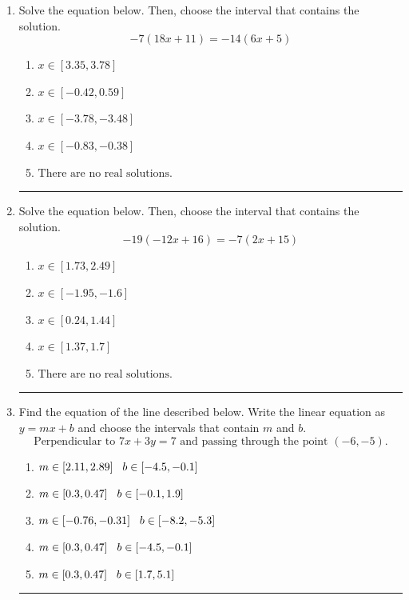 \documentclass[14pt]{extbook}
\newcommand{\litem}[1]{\item#1\hspace*{-1cm}\rule{\textwidth}{0.4pt}}
\begin{document}
\begin{enumerate}
{\begin{enumerate}[label=\Alph*.]
\end{enumerate} }
\litem{
Solve the equation below. Then, choose the interval that contains the solution.\[ -7(18x + 11) = -14(6x + 5) \]\begin{enumerate}[label=\Alph*.]
\item \( x \in [3.35, 3.78] \)
\item \( x \in [-0.42, 0.59] \)
\item \( x \in [-3.78, -3.48] \)
\item \( x \in [-0.83, -0.38] \)
\item \( \text{There are no real solutions.} \)

\end{enumerate} }
\litem{
Solve the equation below. Then, choose the interval that contains the solution.\[ -19(-12x + 16) = -7(2x + 15) \]\begin{enumerate}[label=\Alph*.]
\item \( x \in [1.73, 2.49] \)
\item \( x \in [-1.95, -1.6] \)
\item \( x \in [0.24, 1.44] \)
\item \( x \in [1.37, 1.7] \)
\item \( \text{There are no real solutions.} \)

\end{enumerate} }
\litem{
Find the equation of the line described below. Write the linear equation as $ y=mx+b $ and choose the intervals that contain $m$ and $b$.\[ \text{Perpendicular to } 7 x + 3 y = 7 \text{ and passing through the point } (-6, -5). \]\begin{enumerate}[label=\Alph*.]
\item \( m \in [2.11, 2.89] \hspace*{3mm} b \in [-4.5, -0.1] \)
\item \( m \in [0.3, 0.47] \hspace*{3mm} b \in [-0.1, 1.9] \)
\item \( m \in [-0.76, -0.31] \hspace*{3mm} b \in [-8.2, -5.3] \)
\item \( m \in [0.3, 0.47] \hspace*{3mm} b \in [-4.5, -0.1] \)
\item \( m \in [0.3, 0.47] \hspace*{3mm} b \in [1.7, 5.1] \)


\end{enumerate}}
\end{enumerate}
\end{document}
